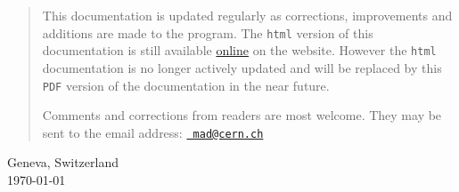 \begin{titlepage}
\begin{quotation}
This documentation is updated regularly as corrections, improvements
and additions are made to the program. 
The {\tt html} version of this documentation is still
available \href{http://cern.ch/madx/madX/doc/usrguide/uguide.html}{online}
on the \href{http://cern.ch/madx}{\madx} website. However the {\tt html}
documentation is no longer actively updated and  will be replaced
by this {\tt PDF} version of the documentation in the near future. 

Comments and corrections from readers are most welcome. They may be sent to the
email address: \href{mailto:mad@cern.ch?subject=[user's guide]}{\tt 
mad@cern.ch}
\end{quotation}
\vfill

\begin{center}
Geneva, Switzerland \\
\today
\end{center}

\end{titlepage}



